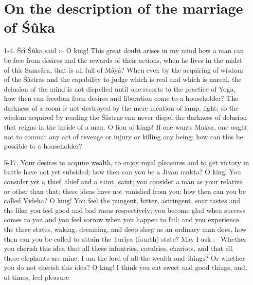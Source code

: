 \chapter{On the description of the marriage of \'S\^uka}

1-4. \'Sr\^i \'S\^uka said :-- O king! This great doubt arises in my mind how a man can be free from desires and the rewards of their actions, when he lives in the midst of this Sams\^ara, that is all full of M\^ay\^a? When even by the acquiring of wisdom of the \'S\^astras and the capability to judge which is real and which is unreal, the delusion of the mind is not dispelled until one resorts to the practice of Yoga, how then can freedom from desires and liberation come to a householder? The darkness of a room is not destroyed by the mere mention of lamp, light; so the wisdom acquired by reading the \'S\^astras can never dispel the darkness of delusion that reigns in the inside of a man. O lion of kings! If one wants Moksa, one ought not to commit any act of revenge or injury or killing any being; how can this be possible to a householder?

5-17. Your desires to acquire wealth, to enjoy royal pleasures and to get victory in battle have not yet subsided; how then can you be a Jivan mukta? O king! You consider yet a thief, thief and a saint, saint; you consider a man as your relative or other than that; these ideas have not vanished from you; how then can you be called Videha? O king! You feel the pungent, bitter, astringent, sour tastes and the like; you feel good and bad rasas respectively; you become glad when success comes to you and you feel sorrow when you happen to fail; and you experience the three states, waking, dreaming, and deep sleep as an ordinary man does, how then can you be called to attain the Tur\^iya (fourth) state? May I ask :-- Whether you cherish this idea that all these infantries, cavalries, chariots, and that all these elephants are mine; I am the lord of all the wealth and things? Or whether you do not cherish this idea? O king! I think you eat sweet and good things, and, at times, feel pleasure

